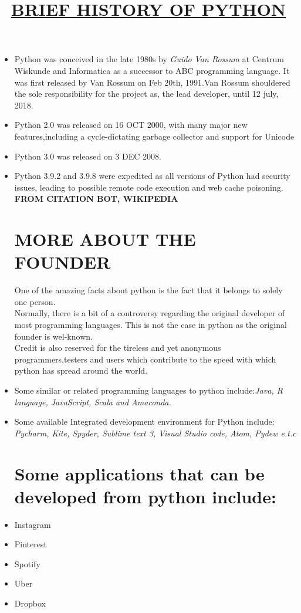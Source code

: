 \documentclass{article}
\begin{document}
		\title{\underline{\textbf{BRIEF HISTORY OF PYTHON}}}
		\maketitle
		\begin{itemize}
			\item Python was conceived in the late 1980s by \emph{Guido Van Rossum} at Centrum Wiskunde and Informatica as a successor to ABC programming language. It was first released by Van Rossum on Feb 20th, 1991.Van Rossum shouldered the sole responsibility for the project as, the lead developer, until 12 july, 2018.
			\item Python 2.0 was released on 16 OCT 2000, with many major new features,including a cycle-dictating garbage collector and support for Unicode
			\item Python 3.0 was released on 3 DEC 2008.
			\item Python 3.9.2 and 3.9.8 were expedited as all versions of Python had security issues, leading to possible remote code execution and web cache poisoning.
			\\ \textbf{FROM CITATION BOT, WIKIPEDIA}
			\section{MORE ABOUT THE FOUNDER}
			One of the amazing facts about python is the fact that it belongs to solely one person.
			\\ Normally, there is a bit of a controversy regarding the original developer of most programming languages. This is not the case in python as the original founder is wel-known.
			\\Credit is also reserved for the tireless and yet anonymous programmers,testers and users which contribute to the speed with which python has spread around the world.
			\item Some similar or related programming languages to python include:\emph{Java, R language, JavaScript, Scala and Amaconda.}
			\item Some available Integrated development environment for Python include: \emph{Pycharm, Kite, Spyder, Sublime text 3, Visual Studio code, Atom, Pydew e.t.c}
			\section{Some applications that can be developed from python include:}
			\item Instagram
			\item Pinterest
			\item Spotify
			\item Uber
			\item Dropbox
		\end{itemize}
		
\end{document}
